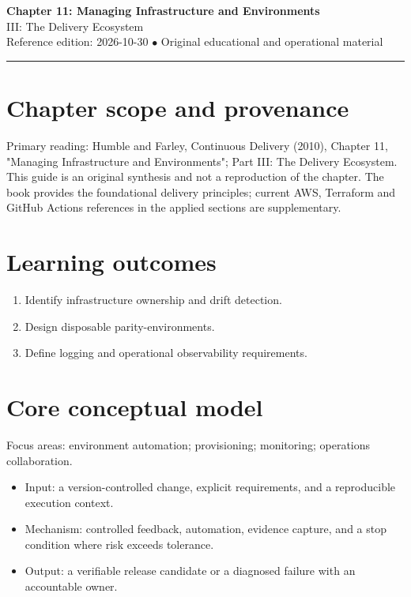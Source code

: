 \documentclass[10pt,letterpaper]{article}
\begin{document}
\begin{center}
{\LARGE\bfseries\color{cdblue}Chapter 11: Managing Infrastructure and Environments}\\[7pt]
{\large III: The Delivery Ecosystem}\\[6pt]
{\small Reference edition: 2026-10-30 $\bullet$ Original educational and operational material}
\end{center}
\noindent\color{cdblue}\rule{\linewidth}{1.2pt}\color{black}
\vspace{0.4em}
\section{Chapter scope and provenance}
Primary reading: Humble and Farley, Continuous Delivery (2010), Chapter 11, "Managing Infrastructure and Environments"; Part III: The Delivery Ecosystem. This guide is an original synthesis and not a reproduction of the chapter. The book provides the foundational delivery principles; current AWS, Terraform and GitHub Actions references in the applied sections are supplementary.


\section{Learning outcomes}
\begin{enumerate}
\item Identify infrastructure ownership and drift detection.
\item Design disposable parity-environments.
\item Define logging and operational observability requirements.
\end{enumerate}

\section{Core conceptual model}
Focus areas: environment automation; provisioning; monitoring; operations collaboration.

\begin{itemize}
\item Input: a version-controlled change, explicit requirements, and a reproducible execution context.
\item Mechanism: controlled feedback, automation, evidence capture, and a stop condition where risk exceeds tolerance.
\item Output: a verifiable release candidate or a diagnosed failure with an accountable owner.
\end{itemize}
\end{document}

